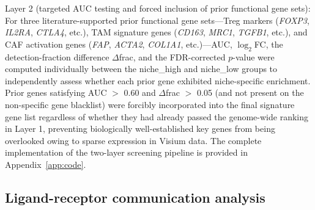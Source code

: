 \documentclass[12pt, a4paper]{article}
\begin{document}
Layer 2 (targeted AUC testing and forced inclusion of prior functional gene sets): For three literature-supported prior functional gene sets—Treg markers (\textit{FOXP3}, \textit{IL2RA}, \textit{CTLA4}, etc.), TAM signature genes (\textit{CD163}, \textit{MRC1}, \textit{TGFB1}, etc.), and CAF activation genes (\textit{FAP}, \textit{ACTA2}, \textit{COL1A1}, etc.)—AUC, $\log_2$FC, the detection-fraction difference $\Delta$frac, and the FDR-corrected $p$-value were computed individually between the niche\_high and niche\_low groups to independently assess whether each prior gene exhibited niche-specific enrichment. Prior genes satisfying AUC $>$ 0.60 and $\Delta$frac $>$ 0.05 (and not present on the non-specific gene blacklist) were forcibly incorporated into the final signature gene list regardless of whether they had already passed the genome-wide ranking in Layer 1, preventing biologically well-established key genes from being overlooked owing to sparse expression in Visium data. The complete implementation of the two-layer screening pipeline is provided in Appendix~\ref{app:code}.

\subsection{Ligand-receptor communication analysis}
\end{document}
